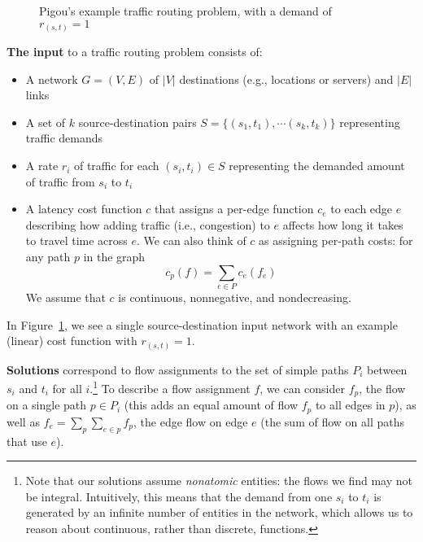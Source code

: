 \documentclass[acmlarge]{acmart}
\begin{document}
\begin{figure}[ht!]
\begin{center}
\end{center}
    \caption{Pigou's example traffic routing problem, with a demand of $r_{(s,t)} = 1$}
\label{fig:Pigou}
\end{figure}

\medskip\noindent
\textbf{The input} to a traffic routing problem consists of:
\begin{itemize}
    \item A network $G = (V, E)$ of $|V|$ destinations (e.g., locations or servers) and $|E|$ links 
    \item A set of $k$ source-destination pairs $S=\{(s_1,t_1), \cdots (s_k,t_k)\}$ representing traffic demands
    \item A {rate} $r_i$ of traffic for each $(s_i,t_i)\in S$ representing the demanded amount of traffic from $s_i$ to $t_i$
    \item A {latency} cost function $c$ that assigns a per-edge function $c_e$ to each edge $e$ describing how adding traffic (i.e., congestion) to $e$ affects how long it takes to travel time across $e$. We can also think of $c$ as assigning per-path costs: for any path $p$ in the graph
        $$c_p(f) = \sum_{e\in P}c_e(f_e)$$ 
        We assume that $c$ is continuous, nonnegative, and nondecreasing.
\end{itemize}
In Figure~\ref{fig:Pigou}, we see a single source-destination input network with an example (linear) cost function with $r_{(s,t)} = 1$.

\medskip\noindent
\textbf{Solutions} correspond to flow assignments to the set of simple paths $P_i$ between $s_i$ and $t_i$ for all $i$.\footnote{Note that our solutions assume \emph{nonatomic} entities: the flows we find may not be integral. 
Intuitively, this means that the demand from one $s_i$ to $t_i$ is generated by an infinite number
of entities in the network, which allows us to reason about continuous, rather than discrete, functions.}
%
To describe a flow assignment $f$, we can consider $f_p$, the flow on a single path $p \in P_i$ (this adds an equal amount of flow $f_p$ to all edges in $p$), as well as $f_e = \sum_p \sum_{e\in p} f_p$, the edge flow on edge $e$ (the sum of flow on all paths that use $e$).
\end{document}
